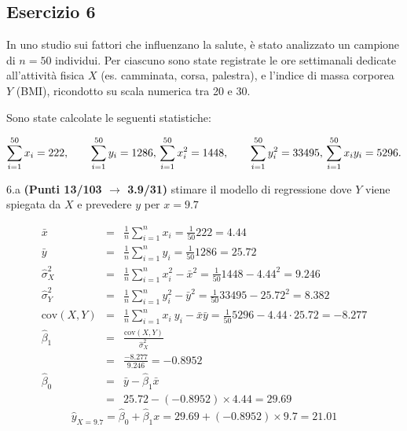 \documentclass[
  11pt,
]{book}
\theoremstyle{mytheoremstyle}
\theoremstyle{mydefstyle}
\newenvironment{sol}
  {
  \begin{tcolorbox}[enhanced,breakable,arc=0.1mm,boxrule=1pt,colback=white,colframe=iblue,
  title=\bf \fontfamily{lmss}\selectfont \hspace{.5 cm} Soluzione,drop fuzzy shadow]

}{
\end{tcolorbox}
  }
\begin{document}
\subsection{Esercizio 6}\label{esercizio-6-38}

In uno studio sui fattori che influenzano la salute, è stato analizzato un campione di \(n = 50\) individui. Per ciascuno sono state registrate le ore settimanali dedicate all'attività fisica \(X\) (es. camminata, corsa, palestra), e l'indice di massa corporea \(Y\) (BMI), ricondotto su scala numerica tra 20 e 30.

Sono state calcolate le seguenti statistiche:

\[
\sum_{i=1}^{50} x_i = 222, \qquad \sum_{i=1}^{50} y_i = 1286, \\
\sum_{i=1}^{50} x_i^2 = 1448, \qquad \sum_{i=1}^{50} y_i^2 = 33495, \\
\sum_{i=1}^{50} x_i y_i = 5296.
\]

6.a \textbf{(Punti 13/103 \(\rightarrow\) 3.9/31)} stimare il modello di regressione dove \(Y\) viene spiegata da \(X\) e prevedere \(y\) per \(x=9.7\)

\begin{sol}
\begin{eqnarray*}
           \bar x &=&\frac 1 n\sum_{i=1}^n x_i = \frac {1}{ 50 }  222 =  4.44 \\
           \bar y &=&\frac 1 n\sum_{i=1}^n y_i = \frac {1}{ 50 }  1286 =  25.72 \\
           \hat\sigma_X^2&=&\frac 1 n\sum_{i=1}^n x_i^2-\bar x^2=\frac {1}{ 50 }  1448  - 4.44 ^2= 9.246 \\
           \hat\sigma_Y^2&=&\frac 1 n\sum_{i=1}^n y_i^2-\bar y^2=\frac {1}{ 50 }  33495  - 25.72 ^2= 8.382 \\
           \text{cov}(X,Y)&=&\frac 1 n\sum_{i=1}^n x_i~y_i-\bar x\bar y=\frac {1}{ 50 }  5296 - 4.44 \cdot 25.72 = -8.277 \\
           \hat\beta_1 &=& \frac{\text{cov}(X,Y)}{\hat\sigma_X^2} \\
                    &=& \frac{ -8.277 }{ 9.246 }  =  -0.8952 \\
           \hat\beta_0 &=& \bar y - \hat\beta_1 \bar x\\
                    &=&  25.72 - (-0.8952) \times  4.44 = 29.69 
         \end{eqnarray*}\[\hat y_{X= 9.7 }=\hat\beta_0+\hat\beta_1 x= 29.69 + (-0.8952) \times 9.7 = 21.01 \]

\end{sol}
\end{document}
